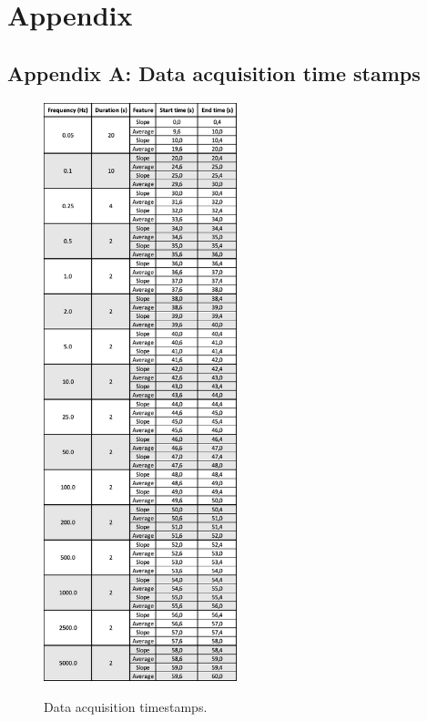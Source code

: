 
\chapter*{Appendix}
\label{cha:appendix}

\pagebreak
\section*{Appendix A: Data acquisition time stamps}
\label{sec:appendix-a}

\begin{figure}[!htb]
	\centering
	\includegraphics[width=0.5\textwidth]{../figures/timestamps.png}
	\label{fig:timestamps}
	\caption{Data acquisition timestamps.}
\end{figure}